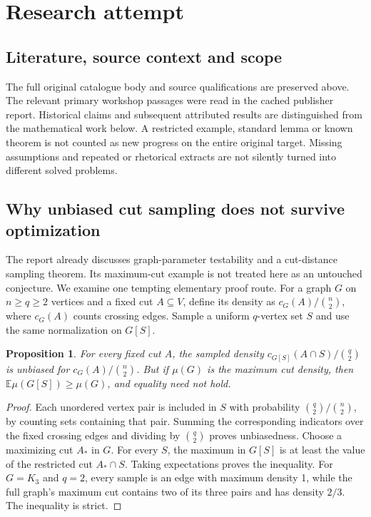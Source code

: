 \documentclass[11pt]{article}
\newtheorem{proposition}{Proposition}
\begin{document}
\section{Research attempt}
\subsection{Literature, source context and scope}
The full original catalogue body and source qualifications are preserved above. The relevant primary workshop passages were read in the cached publisher report. Historical claims and subsequent attributed results are distinguished from the mathematical work below. A restricted example, standard lemma or known theorem is not counted as new progress on the entire original target. Missing assumptions and repeated or rhetorical extracts are not silently turned into different solved problems.

\subsection{Why unbiased cut sampling does not survive optimization}
The report already discusses graph-parameter testability and a cut-distance sampling theorem. Its maximum-cut example is not treated here as an untouched conjecture. We examine one tempting elementary proof route. For a graph $G$ on $n\ge q\ge2$ vertices and a fixed cut $A\subseteq V$, define its density as $c_G(A)/\binom n2$, where $c_G(A)$ counts crossing edges. Sample a uniform $q$-vertex set $S$ and use the same normalization on $G[S]$.
\begin{proposition}
For every fixed cut $A$, the sampled density $c_{G[S]}(A\cap S)/\binom q2$ is unbiased for $c_G(A)/\binom n2$. But if $\mu(G)$ is the maximum cut density, then $\mathbb E\mu(G[S])\ge\mu(G)$, and equality need not hold.
\end{proposition}
\begin{proof}
Each unordered vertex pair is included in $S$ with probability $\binom q2/\binom n2$, by counting sets containing that pair. Summing the corresponding indicators over the fixed crossing edges and dividing by $\binom q2$ proves unbiasedness. Choose a maximizing cut $A_*$ in $G$. For every $S$, the maximum in $G[S]$ is at least the value of the restricted cut $A_*\cap S$. Taking expectations proves the inequality. For $G=K_3$ and $q=2$, every sample is an edge with maximum density 1, while the full graph's maximum cut contains two of its three pairs and has density $2/3$. The inequality is strict.
\end{proof}
\end{document}
